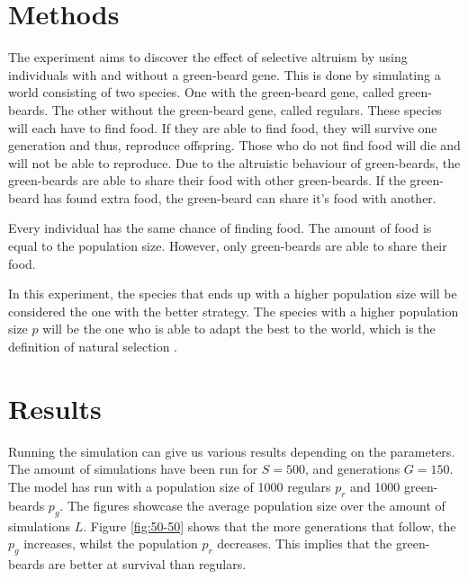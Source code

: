 \documentclass[conference]{IEEEtran}
\begin{document}
	\section{Methods}
	The experiment aims to discover the effect of selective altruism by using individuals with and without a green-beard gene. This is done by simulating a world consisting of two species. One with the green-beard gene, called green-beards. The other without the green-beard gene, called regulars. These species will each have to find food. If they are able to find food, they will survive one generation and thus, reproduce offspring. Those who do not find food will die and will not be able to reproduce. Due to the altruistic behaviour of green-beards, the green-beards are able to share their food with other green-beards. If the green-beard has found extra food, the green-beard can share it's food with another. 
	
	Every individual has the same chance of finding food. The amount of food is equal to the population size. However, only green-beards are able to share their food.
	
	In this experiment, the species that ends up with a higher population size  will be considered the one with the better strategy. The species with a higher population size $p$ will be the one who is able to adapt the best to the world, which is the definition of natural selection \cite{fisher1958genetical}.
	
	\section{Results}
	Running the simulation can give us various results depending on the parameters. The amount of simulations have been run for $S = 500$, and generations $G = 150$. The model has run with a population size of 1000 regulars $p_r$ and 1000 green-beards $p_g$. The figures showcase the average population size over the amount of simulations $L$. Figure \ref{fig:50-50} shows that the more generations that follow, the $p_g$ increases, whilst the population $p_r$ decreases. This implies that the green-beards are better at survival than regulars. 
\end{document}
